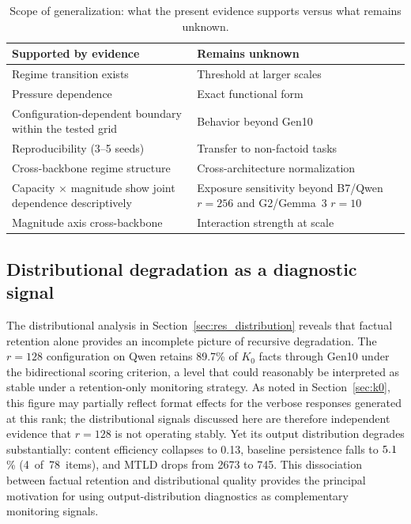 \documentclass[a4paper,fleqn]{cas-dc}
\newif\ifshowchanges
\newcommand{\rev}[1]{\ifshowchanges{\color{blue}#1}\else{#1}\fi}
\renewcommand{\arraystretch}{1.8}
\begin{document}
\begin{table}[!htbp]
\caption{Scope of generalization: what the present evidence supports versus
what remains unknown.}\label{tab:generalization}
\footnotesize
\renewcommand{\arraystretch}{1.4}
\begin{tabular}{@{}p{3.6cm}p{3.6cm}@{}}
\toprule
\textbf{Supported by evidence} & \textbf{Remains unknown} \\
\midrule
Regime transition exists & Threshold at larger scales \\
\addlinespace
Pressure dependence & Exact functional form \\
\addlinespace
\rev{Configuration-dependent boundary within the tested grid} & Behavior beyond Gen10 \\
\addlinespace
Reproducibility (3--5 seeds) & Transfer to non-factoid tasks \\
\addlinespace
Cross-backbone regime structure & Cross-architecture normalization \\
\addlinespace
Capacity $\times$ magnitude \rev{show joint dependence descriptively} & \rev{Exposure sensitivity beyond B7/Qwen $r=256$ and G2/Gemma~3 $r=10$} \\
\addlinespace
Magnitude axis cross-backbone & Interaction strength at scale \\
\bottomrule
\end{tabular}
\end{table}

\subsection{Distributional degradation as a diagnostic signal}\label{sec:disc_drift}

The distributional analysis in Section~\ref{sec:res_distribution} reveals that
factual retention alone provides an incomplete picture of recursive degradation.
The $r=128$ configuration on Qwen retains 89.7\% of $K_0$ facts through Gen10
under the bidirectional scoring criterion,
a level that could reasonably be interpreted as stable under a retention-only
monitoring strategy. As noted in Section~\ref{sec:k0}, this figure may
partially reflect format effects for the verbose responses generated at this
rank; the distributional signals discussed here are therefore independent
evidence that $r=128$ is not operating stably. Yet its output distribution degrades substantially: content
efficiency collapses to 0.13, baseline persistence falls to \rev{$5.1$\% (4~of~78~items)}, and MTLD
drops from 2673 to 745. This dissociation between factual retention and
distributional quality provides the principal motivation for using
output-distribution diagnostics as complementary monitoring signals.
\end{document}

